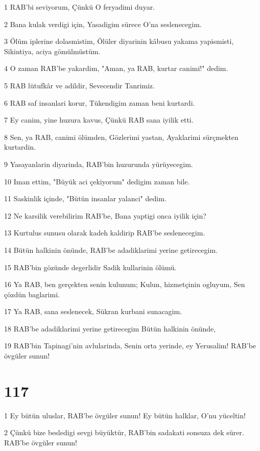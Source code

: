 \par 1 RAB'bi seviyorum, Çünkü O feryadimi duyar.
\par 2 Bana kulak verdigi için, Yasadigim sürece O'na seslenecegim.
\par 3 Ölüm iplerine dolasmistim, Ölüler diyarinin kâbusu yakama yapismisti, Sikintiya, aciya gömülmüstüm.
\par 4 O zaman RAB'be yakardim, "Aman, ya RAB, kurtar canimi!" dedim.
\par 5 RAB lütufkâr ve adildir, Sevecendir Tanrimiz.
\par 6 RAB saf insanlari korur, Tükendigim zaman beni kurtardi.
\par 7 Ey canim, yine huzura kavus, Çünkü RAB sana iyilik etti.
\par 8 Sen, ya RAB, canimi ölümden, Gözlerimi yastan, Ayaklarimi sürçmekten kurtardin.
\par 9 Yasayanlarin diyarinda, RAB'bin huzurunda yürüyecegim.
\par 10 Iman ettim, "Büyük aci çekiyorum" dedigim zaman bile.
\par 11 Saskinlik içinde, "Bütün insanlar yalanci" dedim.
\par 12 Ne karsilik verebilirim RAB'be, Bana yaptigi onca iyilik için?
\par 13 Kurtulus sunusu olarak kadeh kaldirip RAB'be seslenecegim.
\par 14 Bütün halkinin önünde, RAB'be adadiklarimi yerine getirecegim.
\par 15 RAB'bin gözünde degerlidir Sadik kullarinin ölümü.
\par 16 Ya RAB, ben gerçekten senin kulunum; Kulun, hizmetçinin ogluyum, Sen çözdün baglarimi.
\par 17 Ya RAB, sana seslenecek, Sükran kurbani sunacagim.
\par 18 RAB'be adadiklarimi yerine getirecegim Bütün halkinin önünde,
\par 19 RAB'bin Tapinagi'nin avlularinda, Senin orta yerinde, ey Yerusalim! RAB'be övgüler sunun!

\chapter{117}

\par 1 Ey bütün uluslar, RAB'be övgüler sunun! Ey bütün halklar, O'nu yüceltin!
\par 2 Çünkü bize besledigi sevgi büyüktür, RAB'bin sadakati sonsuza dek sürer. RAB'be övgüler sunun!

